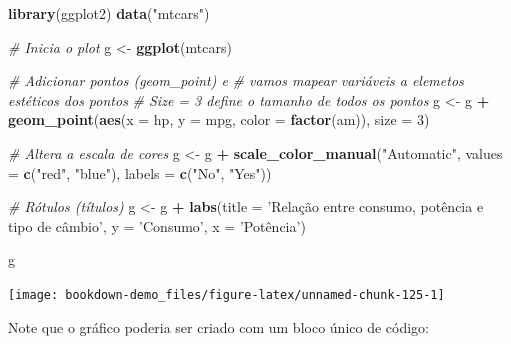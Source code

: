 \documentclass[]{book}
\newenvironment{Shaded}{\begin{snugshade}}{\end{snugshade}}
\newcommand{\KeywordTok}[1]{\textcolor[rgb]{0.13,0.29,0.53}{\textbf{#1}}}
\newcommand{\DataTypeTok}[1]{\textcolor[rgb]{0.13,0.29,0.53}{#1}}
\newcommand{\DecValTok}[1]{\textcolor[rgb]{0.00,0.00,0.81}{#1}}
\newcommand{\StringTok}[1]{\textcolor[rgb]{0.31,0.60,0.02}{#1}}
\newcommand{\CommentTok}[1]{\textcolor[rgb]{0.56,0.35,0.01}{\textit{#1}}}
\newcommand{\OperatorTok}[1]{\textcolor[rgb]{0.81,0.36,0.00}{\textbf{#1}}}
\newcommand{\NormalTok}[1]{#1}
\begin{document}
\begin{Shaded}
\begin{Highlighting}[]
\KeywordTok{library}\NormalTok{(ggplot2)}
\KeywordTok{data}\NormalTok{(}\StringTok{"mtcars"}\NormalTok{)}

\CommentTok{# Inicia o plot}
\NormalTok{g <-}\StringTok{ }\KeywordTok{ggplot}\NormalTok{(mtcars)}

\CommentTok{# Adicionar pontos (geom_point) e}
\CommentTok{# vamos mapear variáveis a elemetos estéticos dos pontos}
\CommentTok{# Size = 3 define o tamanho de todos os pontos}
\NormalTok{g <-}\StringTok{ }\NormalTok{g }\OperatorTok{+}
\StringTok{  }\KeywordTok{geom_point}\NormalTok{(}\KeywordTok{aes}\NormalTok{(}\DataTypeTok{x =}\NormalTok{ hp, }\DataTypeTok{y =}\NormalTok{ mpg, }\DataTypeTok{color =} \KeywordTok{factor}\NormalTok{(am)),}
             \DataTypeTok{size =} \DecValTok{3}\NormalTok{)}

\CommentTok{# Altera a escala de cores}
\NormalTok{g <-}\StringTok{ }\NormalTok{g }\OperatorTok{+}
\StringTok{  }\KeywordTok{scale_color_manual}\NormalTok{(}\StringTok{"Automatic"}\NormalTok{,}
                     \DataTypeTok{values =} \KeywordTok{c}\NormalTok{(}\StringTok{"red"}\NormalTok{, }\StringTok{"blue"}\NormalTok{),}
                     \DataTypeTok{labels =} \KeywordTok{c}\NormalTok{(}\StringTok{"No"}\NormalTok{, }\StringTok{"Yes"}\NormalTok{))}

\CommentTok{# Rótulos (títulos)}
\NormalTok{g <-}\StringTok{ }\NormalTok{g }\OperatorTok{+}
\StringTok{  }\KeywordTok{labs}\NormalTok{(}\DataTypeTok{title =} \StringTok{'Relação entre consumo, potência e tipo de câmbio'}\NormalTok{,}
       \DataTypeTok{y =} \StringTok{'Consumo'}\NormalTok{,}
       \DataTypeTok{x =} \StringTok{'Potência')}

\StringTok{g}
\end{Highlighting}
\end{Shaded}

\begin{center}\texttt{[image: bookdown-demo\_files/figure-latex/unnamed-chunk-125-1]} \end{center}

Note que o gráfico poderia ser criado com um bloco único de código:
\end{document}
